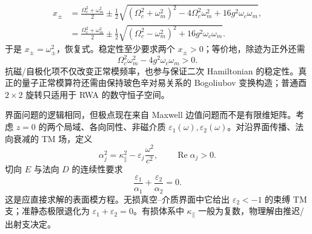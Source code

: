 \begin{exbox}
\begin{align*}
 x_\pm
 &=\frac{\Omega_c^2+\omega_m^2}{2}
 \pm\frac12\sqrt{(\Omega_c^2+\omega_m^2)^2
 -4\Omega_c^2\omega_m^2+16g^2\omega_c\omega_m},\\
 &=\frac{\Omega_c^2+\omega_m^2}{2}
 \pm\frac12\sqrt{(\Omega_c^2-\omega_m^2)^2
 +16g^2\omega_c\omega_m}.
\end{align*}
于是 $x_\pm=\omega_\pm^2$，恢复式。稳定性至少要求两个 $x_\pm>0$；等价地，除迹为正外还需
\begin{equation*}
 \Omega_c^2\omega_m^2-4g^2\omega_c\omega_m>0.
\end{equation*}
抗磁/自极化项不仅改变正常模频率，也参与保证二次 Hamiltonian 的稳定性。真正的量子正常模算符还需由保持玻色辛对易关系的 Bogoliubov 变换构造；普通酉 $2\times2$ 旋转只适用于 RWA 的数守恒子空间。
\end{exbox}

界面问题的逻辑相同，但极点现在来自 Maxwell 边值问题而不是有限维矩阵。考虑 $z=0$ 的两个局域、各向同性、非磁介质 $\varepsilon_1(\omega),\varepsilon_2(\omega)$。对沿界面传播、法向衰减的 TM 场，定义
\begin{equation*}
\alpha_j^2=\kappa_\parallel^2-\varepsilon_j\frac{\omega^2}{c^2},
\qquad
\operatorname{Re}\alpha_j>0.
\end{equation*}
切向 $E$ 与法向 $D$ 的连续性要求
\begin{equation}
\boxed{
\frac{\varepsilon_1}{\alpha_1}+\frac{\varepsilon_2}{\alpha_2}=0.}
\label{eq:tm_surface_mode_condition}
\end{equation}
这是应直接求解的表面模方程。无损真空--介质界面中它给出 $\varepsilon_2<-1$ 的束缚 TM 支；准静态极限退化为 $\varepsilon_1+\varepsilon_2=0$。有损体系中 $\kappa_\parallel$ 一般为复数，物理解由推迟/出射支决定。

